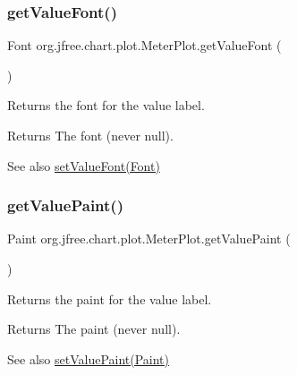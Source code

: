 \subsubsection{\texorpdfstring{get\+Value\+Font()}{getValueFont()}}
{\footnotesize\ttfamily Font org.\+jfree.\+chart.\+plot.\+Meter\+Plot.\+get\+Value\+Font (\begin{DoxyParamCaption}{ }\end{DoxyParamCaption})}

Returns the font for the value label.

\begin{DoxyReturn}{Returns}
The font (never {\ttfamily null}).
\end{DoxyReturn}
\begin{DoxySeeAlso}{See also}
\mbox{\hyperlink{classorg_1_1jfree_1_1chart_1_1plot_1_1_meter_plot_a12feccbac31a09ab9512c424f38bdef4}{set\+Value\+Font(\+Font)}} 
\end{DoxySeeAlso}
\mbox{\label{classorg_1_1jfree_1_1chart_1_1plot_1_1_meter_plot_aedb95f7f25ba6d7083dfeb8c1786d626}} 
\subsubsection{\texorpdfstring{get\+Value\+Paint()}{getValuePaint()}}
{\footnotesize\ttfamily Paint org.\+jfree.\+chart.\+plot.\+Meter\+Plot.\+get\+Value\+Paint (\begin{DoxyParamCaption}{ }\end{DoxyParamCaption})}

Returns the paint for the value label.

\begin{DoxyReturn}{Returns}
The paint (never {\ttfamily null}).
\end{DoxyReturn}
\begin{DoxySeeAlso}{See also}
\mbox{\hyperlink{classorg_1_1jfree_1_1chart_1_1plot_1_1_meter_plot_a35b5c4f95211a811e7efc9e2015d0886}{set\+Value\+Paint(\+Paint)}} 
\end{DoxySeeAlso}
\mbox{\label{classorg_1_1jfree_1_1chart_1_1plot_1_1_meter_plot_aba3154ee89861d9e3ca9b0fd7239b829}} 
